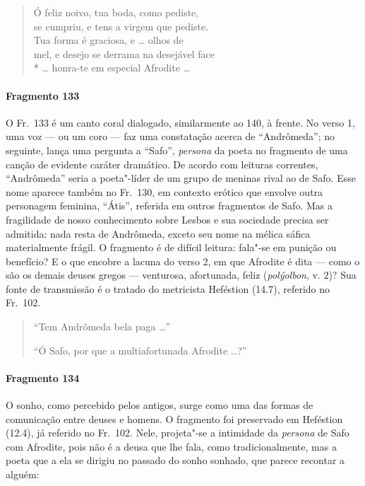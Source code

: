 \begin{verse}
Ó feliz noivo, tua boda, como pediste,\\
se cumpriu, e tens a virgem que pediste.\\
Tua forma é graciosa, e \ldots{} olhos de\\
mel, e desejo se derrama na desejável face\\*
\ldots{} honra-te em especial Afrodite \ldots{}
\end{verse}

\paragraph{Fragmento 133}

{\small O Fr.~133 é um canto coral dialogado, similarmente ao 140, à frente. No verso 1, uma voz --- ou um coro --- faz uma constatação acerca de ``Andrômeda”; no seguinte,
lança uma pergunta a ``Safo”, \textit{persona }da poeta no fragmento de
uma canção de evidente caráter dramático. De acordo com leituras correntes,
``Andrômeda” seria a poeta"-líder de um grupo de
meninas rival ao de Safo. Esse nome aparece também no Fr.~130, em contexto
erótico que envolve outra personagem feminina, “Átis”, referida em
outros fragmentos de Safo. Mas a fragilidade de nosso conhecimento sobre Lesbos
e sua sociedade precisa ser admitida: nada resta de Andrômeda, exceto seu nome
na mélica sáfica materialmente frágil. O fragmento é de difícil leitura:
fala"-se em punição ou benefício? E o que encobre a lacuna do verso 2, em que
Afrodite é dita --- como o são os demais deuses gregos --- venturosa, afortunada,
feliz (\textit{polýolbon}, v. 2)? Sua fonte de transmissão é o tratado do metricista Heféstion (14.7), referido
no Fr.~102.}

\begin{verse}
“Tem Andrômeda bela paga \ldots{}”

{\centering\ast\quad\ast\quad\ast}

“Ó Safo, por que a multiafortunada Afrodite \ldots{}?”
\end{verse}

\paragraph{Fragmento 134}

{\small O sonho, como percebido pelos antigos, surge como uma das formas de 
comunicação entre deuses e homens. O fragmento foi preservado em Heféstion (12.4), já
referido no Fr.~102. Nele, projeta"-se a intimidade da \textit{persona} de Safo com Afrodite, pois não é a deusa que lhe fala, como tradicionalmente, mas a poeta que a ela se dirigiu no passado do sonho sonhado, que parece recontar a alguém:}

